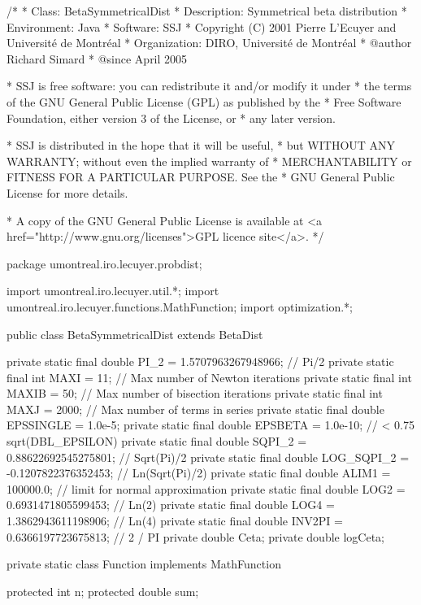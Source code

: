 \begin{code}\begin{hide}
/*
 * Class:        BetaSymmetricalDist
 * Description:  Symmetrical beta distribution
 * Environment:  Java
 * Software:     SSJ 
 * Copyright (C) 2001  Pierre L'Ecuyer and Université de Montréal
 * Organization: DIRO, Université de Montréal
 * @author       Richard Simard
 * @since        April 2005

 * SSJ is free software: you can redistribute it and/or modify it under
 * the terms of the GNU General Public License (GPL) as published by the
 * Free Software Foundation, either version 3 of the License, or
 * any later version.

 * SSJ is distributed in the hope that it will be useful,
 * but WITHOUT ANY WARRANTY; without even the implied warranty of
 * MERCHANTABILITY or FITNESS FOR A PARTICULAR PURPOSE.  See the
 * GNU General Public License for more details.

 * A copy of the GNU General Public License is available at
   <a href="http://www.gnu.org/licenses">GPL licence site</a>.
 */
\end{hide}
package  umontreal.iro.lecuyer.probdist;
\begin{hide}
import umontreal.iro.lecuyer.util.*;
import umontreal.iro.lecuyer.functions.MathFunction;
import optimization.*;
\end{hide}

public class BetaSymmetricalDist extends BetaDist\begin{hide} {
   private static final double PI_2 = 1.5707963267948966;   // Pi/2
   private static final int MAXI = 11;   // Max number of Newton iterations
   private static final int MAXIB = 50;  // Max number of bisection iterations
   private static final int MAXJ = 2000; // Max number of terms in series
   private static final double EPSSINGLE = 1.0e-5;
   private static final double EPSBETA = 1.0e-10; // < 0.75 sqrt(DBL_EPSILON)
   private static final double SQPI_2 = 0.88622692545275801; // Sqrt(Pi)/2
   private static final double LOG_SQPI_2 = -0.1207822376352453; // Ln(Sqrt(Pi)/2)
   private static final double ALIM1 = 100000.0; // limit for normal approximation
   private static final double LOG2 = 0.6931471805599453;   // Ln(2)
   private static final double LOG4 = 1.3862943611198906;   // Ln(4)
   private static final double INV2PI = 0.6366197723675813; // 2 / PI
   private double Ceta;
   private double logCeta;

   private static class Function implements MathFunction
   {
      protected int n;
      protected double sum;

}}
\end{hide}
\end{code}
